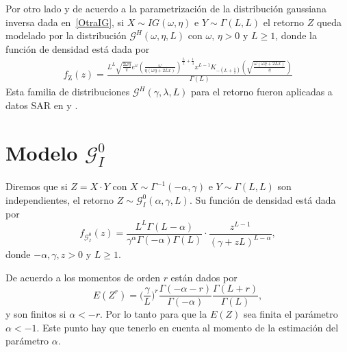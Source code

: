 Por otro lado y de acuerdo a la parametrización de la distribución gaussiana inversa dada en~\eqref{OtraIG}, si $X\sim IG(\omega,\eta)$ e $Y \sim \Gamma(L,L)$ el retorno $Z$ queda modelado por la distribución $ \mathcal{G}^H(\omega,\eta,L)$ con $\omega, \, \eta >0$ y $L \geq 1$, donde la función de densidad está dada por 
\begin{align}
\label{ModeloGH}
f_{\text{Z}}( z) =\frac{L^L \sqrt{\frac{2 \omega  \eta }{\pi }} e^{\omega } \left(\frac{\omega }{\eta  (\omega  \eta +2 L
		x)}\right)^{\frac{L}{2}+\frac{1}{4}} x^{L-1} K_{-\left(L+\frac{1}{2}\right)}\left(\sqrt{\frac{\omega 
			(\omega  \eta +2 L x)}{\eta }}\right)}{\Gamma (L)}
\end{align}
Esta familia de distribuciones $\mathcal{G}^H(\gamma,\lambda,L)$ para el retorno fueron aplicadas a datos SAR en \citet{Buemi2009} y \citet{Jacobo2005}.


\section{Modelo $\mathcal{G}_I^0$}
\label{ModeloGI0}

Diremos que si $Z=X \cdot Y$ con $X \sim \Gamma^{-1}(-\alpha,\gamma)$ e $Y \sim \Gamma(L,L)$ son independientes, el retorno $Z \sim \mathcal{G}_I^0(\alpha,\gamma,L)$. 
Su función de densidad está dada por 
\begin{equation}
f_{\mathcal{G}_I^{0}}( z) =\frac{L^{L}\Gamma ( L-\alpha
	) }{\gamma ^{\alpha }\Gamma ( -\alpha ) \Gamma (
	L) }\cdot  
\frac{z^{L-1}}{( \gamma +zL) ^{L-\alpha }},%
\label{ec_dens_gI0}
\end{equation}
donde $-\alpha,\gamma ,z>0$ y $L\geq 1$.

De acuerdo a \citet{gambini2015} los momentos de orden $r$ están dados por
\begin{equation}
E(Z^r) =\Big(\frac{\gamma}{L}\Big)^r\frac{\Gamma ( -\alpha-r )}{ \Gamma (-\alpha) }
\frac{\Gamma (L+r )}{\Gamma (L)},
\label{moments_gI0}
\end{equation}
y son finitos si $\alpha<-r$. Por lo tanto para que la $E(Z)$ sea finita el parámetro $\alpha<-1$. Este punto hay que tenerlo en cuenta al momento de la estimación del parámetro $\alpha$.

